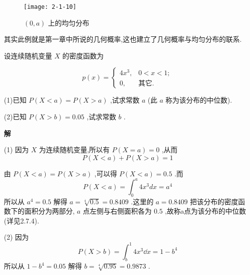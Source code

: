 \begin{figure}
	\centering
	\texttt{[image: 2-1-10]}
	\caption{ $ (0,a) $ 上的均匀分布}
	\label{fig:2.1.10}
\end{figure}

其实此例就是第一章中所说的几何概率,这也建立了几何概率与均匀分布的联系.

\begin{example}\label{exam:2.1.12}
	设连续随机变量 $ X $ 的密度函数为
	
	\[ 
	p(x)=\left\{\begin{array}{ll}
	{4 x^{3},} & {0<x<1}; \\ 
	{0},&{\text{其它}}.
	\end{array}\right.
	\]
	
	(1)已知 $ P(X<a)=P(X>a) $ ,试求常数 $ a $ (此 $ a $ 称为该分布的中位数).
	
	(2)已知 $ P(X>b)=0.05 $ ,试求常数 $ b $ .
	
	\textbf{解}
	
	(1) 因为 $ X $ 为连续随机变量,所以有 $ P(X=a)=0 $ ,从而
	\[ 
	P(X<a)+P(X>a)=1
	\]
	
	由 $ P(X<a)=P(X>a) $ ,可以得 $ P(X<a)=0.5 $ .而
	\[ 
	P(X<a)=\int_{0}^{a} 4 x^{3} d x=a^{4}
	\]
	所以从 $ a^4=0.5 $ 解得 $ a=\sqrt[4]{0.5}=0.8409 $ .这里的 $ a=0.8409 $ 把该分布的密度函数下的面积分为两部分, $ a $ 点左侧与右侧面积各为 $ 0.5 $ ,故称a点为该分布的中位数(详见2.7.4).
	
	(2) 因为
	\[ 
	P(X>b)=\int_{b}^{1} 4 x^{3} \dd x=1-b^{4}
	\]
	所以从 $ 1-b^{4}=0.05 $ 解得 $ b=\sqrt[4]{0.95}=0.9873 $ .
\end{example}

